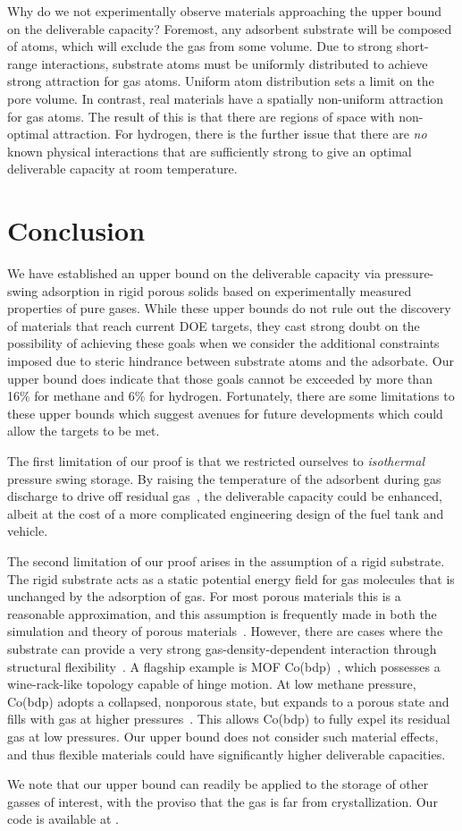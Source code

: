 Why do we not experimentally observe materials approaching the upper bound on
the deliverable capacity? Foremost, any adsorbent substrate will be composed of
atoms, which will exclude the gas from some volume. Due to strong short-range
interactions, substrate atoms must be uniformly distributed to achieve strong
attraction for gas atoms. Uniform atom distribution sets a limit on the pore
volume. In contrast, real materials have a spatially non-uniform attraction for
gas atoms. The result of this is that there are regions of space with
non-optimal attraction. For hydrogen, there is the further issue that there are
\emph{no} known physical interactions that are sufficiently strong to give an
optimal deliverable capacity at room temperature.

\section{Conclusion}
We have established an upper bound on the deliverable capacity via
pressure-swing adsorption in rigid porous solids based on experimentally
measured properties of pure gases. While these upper bounds do not rule out the
discovery of materials that reach current DOE targets, they cast strong doubt
on the possibility of achieving these goals when we consider the additional
constraints imposed due to steric hindrance between substrate atoms and the
adsorbate. Our upper bound does indicate that those goals cannot be exceeded by
more than 16\% for methane and 6\% for hydrogen. Fortunately, there are some
limitations to these upper bounds which suggest avenues for future developments
which could allow the targets to be met.

The first limitation of our proof is that we restricted ourselves to
\emph{isothermal} pressure swing storage. By raising the temperature of the
adsorbent during gas discharge to drive off residual
gas~\cite{gomez2014exploring}, the deliverable capacity could be enhanced,
albeit at the cost of a more complicated engineering design of the fuel tank
and vehicle.

The second limitation of our proof arises in the assumption of a rigid
substrate. The rigid substrate acts as a static potential energy field for gas
molecules that is unchanged by the adsorption of gas. For most porous materials
this is a reasonable approximation, and this assumption is frequently made in
both the simulation and theory of porous materials~\cite{witman2017influence}.
However, there are cases where the substrate can provide a very strong
gas-density-dependent interaction through structural
flexibility~\cite{schneemann2014flexible}. A flagship example is MOF
Co(bdp)~\cite{choi2008broadly}, which possesses a wine-rack-like topology
capable of hinge motion. At low methane pressure, Co(bdp) adopts a collapsed,
nonporous state, but expands to a porous state and fills with gas at higher
pressures~\cite{mason2015methane}. This allows Co(bdp) to fully expel its
residual gas at low pressures. Our upper bound does not consider such material
effects, and thus flexible materials could have significantly higher
deliverable capacities.

We note that our upper bound can readily be applied to the storage of other
gasses of interest, with the proviso that the gas is far from crystallization.
Our code is available at .

